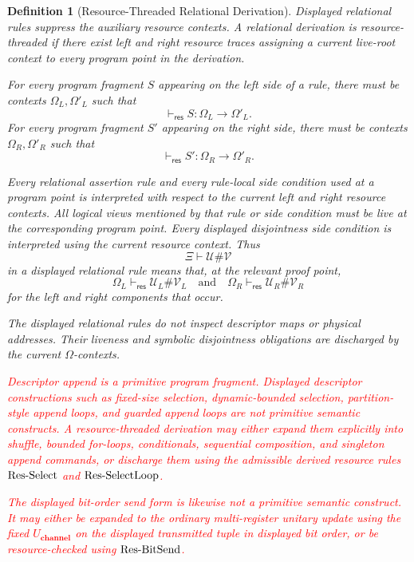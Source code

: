 \documentclass[acmsmall,screen,review,anonymous,nonacm]{acmart}
\newtheorem{definition}{Definition}[section]
\theoremstyle{defn_style}
\begin{document}
\begin{definition}[Resource-Threaded Relational Derivation]
Displayed relational rules suppress the auxiliary resource contexts. A
relational derivation is resource-threaded if there exist left and right
resource traces assigning a current live-root context to every program point in
the derivation.

For every program fragment \(S\) appearing on the left side of a rule, there
must be contexts \(\Omega_L,\Omega'_L\) such that
\[
\vdash_{\mathsf{res}}S:\Omega_L\rightarrow\Omega'_L.
\]
For every program fragment \(S'\) appearing on the right side, there must be
contexts \(\Omega_R,\Omega'_R\) such that
\[
\vdash_{\mathsf{res}}S':\Omega_R\rightarrow\Omega'_R.
\]

Every relational assertion rule and every rule-local side condition used at a
program point is interpreted with respect to the current left and right
resource contexts. All logical views mentioned by that rule or side condition
must be live at the corresponding program point. Every displayed disjointness
side condition is interpreted using the current resource context. Thus
\[
\Xi\vdash \mathcal U\#\mathcal V
\]
in a displayed relational rule means that, at the relevant proof point,
\[
\Omega_L\vdash_{\mathsf{res}}\mathcal U_L\#\mathcal V_L
\quad\text{and}\quad
\Omega_R\vdash_{\mathsf{res}}\mathcal U_R\#\mathcal V_R
\]
for the left and right components that occur.

The displayed relational rules do not inspect descriptor maps or physical
addresses. Their liveness and symbolic disjointness obligations are discharged
by the current \(\Omega\)-contexts.

\textcolor{red}{Descriptor append is a primitive program fragment. Displayed descriptor constructions such as fixed-size selection, dynamic-bounded selection, partition-style append loops, and guarded append loops are not primitive semantic constructs. A resource-threaded derivation may either expand them explicitly into shuffle, bounded for-loops, conditionals, sequential composition, and singleton append commands, or discharge them using the admissible derived resource rules \({\rm Res\mbox{-}Select}\) and \({\rm Res\mbox{-}SelectLoop}\).}

\textcolor{red}{The displayed bit-order send form is likewise not a primitive semantic construct. It may either be expanded to the ordinary multi-register unitary update using the fixed \(U_{\textbf{channel}}\) on the displayed transmitted tuple in displayed bit order, or be resource-checked using \({\rm Res\mbox{-}BitSend}\).}

\end{definition}
\end{document}
